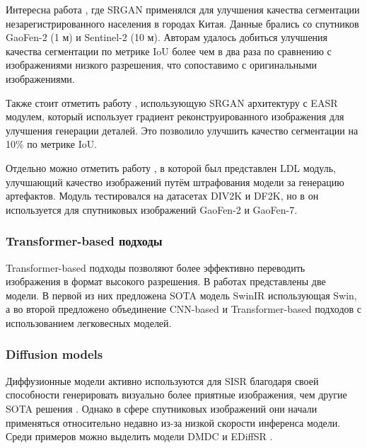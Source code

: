 \documentclass[14pt]{extarticle}
\begin{document}
Интересна работа \cite{unplannedUrban}, где SRGAN применялся для улучшения качества сегментации незарегистрированного населения в городах Китая. Данные брались со спутников GaoFen-2 (1 м) и Sentinel-2 (10 м). Авторам удалось добиться улучшения качества сегментации по метрике IoU более чем в два раза по сравнению с изображениями низкого разрешения, что сопоставимо с оригинальными изображениями.

Также стоит отметить работу \cite{EASR}, использующую SRGAN архитектуру с EASR модулем, который использует градиент реконструированного изображения для улучшения генерации деталей. Это позволило улучшить качество сегментации на 10\% по метрике IoU.

Отдельно можно отметить работу \cite{LDL2022}, в которой был представлен LDL модуль, улучшающий качество изображений путём штрафования модели за генерацию артефактов. Модуль тестировался на датасетах DIV2K и DF2K, но в \cite{SAGAN} он используется для спутниковых изображений GaoFen-2 и GaoFen-7.

\subsubsection{Transformer-based подходы}

Transformer-based подходы позволяют более эффективно переводить изображения в формат высокого разрешения. В работах \cite{Liang2021SwinIRIR, SwinIR+CNN} представлены две модели. В первой из них предложена SOTA модель SwinIR использующая Swin, а во второй предложено объединение CNN-based и Transformer-based подходов с использованием легковесных моделей.

\subsubsection{Diffusion models}

Диффузионные модели активно используются для SISR благодаря своей способности генерировать визуально более приятные изображения, чем другие SOTA решения \cite{SR3, SRDiff}. Однако в сфере спутниковых изображений они начали применяться относительно недавно из-за низкой скорости инференса модели. Среди примеров можно выделить модели DMDC \cite{DMDC} и EDiffSR \cite{EDiffSR}.
\end{document}
